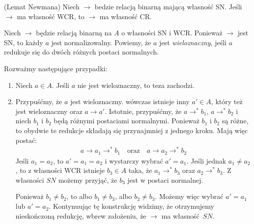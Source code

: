\begin{twierdzenie}(Lemat Newmana)\label{thm:newman_lemma}
Niech \(\to\) bedzie relacją binarną mającą własność SN. Jeśli \(\to\) ma własność WCR, to \(\to\) ma własność CR.
\end{twierdzenie}

\begin{dowod}


Niech \(\to\) będzie relacją binarną na \(A\) o własności SN i WCR. Ponieważ \(\to\) jest SN, to każdy \(a\) jest normalizowalny. Powiemy, że \(a\) jest \emph{wieloznaczny}, jeśli \(a\) redukuje się do dwóch różnych postaci normalnych.

Rozważmy następujące przypadki:

\begin{minipage}{.75\textwidth}
\begin{enumerate}[label={\roman*)}, ref={\roman*)}]
  \setlength\itemsep{0em}
  \item Niech \(a\in A\). Jeśli \(a\) nie jest wieloznaczny, to teza zachodzi.
  \item 
      Przypuśćmy, że \(a\) jest wieloznaczny. wówczas istnieje inny \(a'\in A\), który też jest wieloznaczny oraz \(a\to a'\). Istotnie, przypuśćmy, że \(a\to^{*} b_1\), \(a \to^{*} b_2\) i niech \(b_1\) i \(b_2\) będą różnymi postaciami normalnymi. Ponieważ \(b_1\) i \(b_2\) są różne, to obydwie te redukcje składają się przynajmniej z jednego kroku. Mają więc postać:
      \begin{align*}
        a \to a_1 \to^{*} b_1 \quad \text{oraz} \quad a\to a_2 \to^{*} b_2
      \end{align*}
    Jeśli \(a_1=a_2\), to \(a'=a_1=a_2\) i wystarczy wybrać \(a'=a_1\).
    Jeśli jednak \(a_1 \neq a_2\), to z własności WCR istnieje
    \(b_3 \in A\) taka, że \(a_1 \to^{*} b_3\) oraz \(a_2 \to^{*} b_3\).
    Z własności \(SN\) możemy przyjąć, że \(b_3\) jest w postaci normalnej.


    Ponieważ \(b_1 \neq b_2\), to albo \(b_1 \neq b_3\), albo \(b_2 \neq b_3\).
    Możemy więc wybrać \(a'=a_1\) lub \(a'=a_2\). Kontynuując tę konstrukcję widzimy, że otrzymujemy nieskończoną redukcję, wbrew założeniu, że \(\to\) ma własność \(SN\).


\end{enumerate}
\end{minipage}
\end{dowod}
